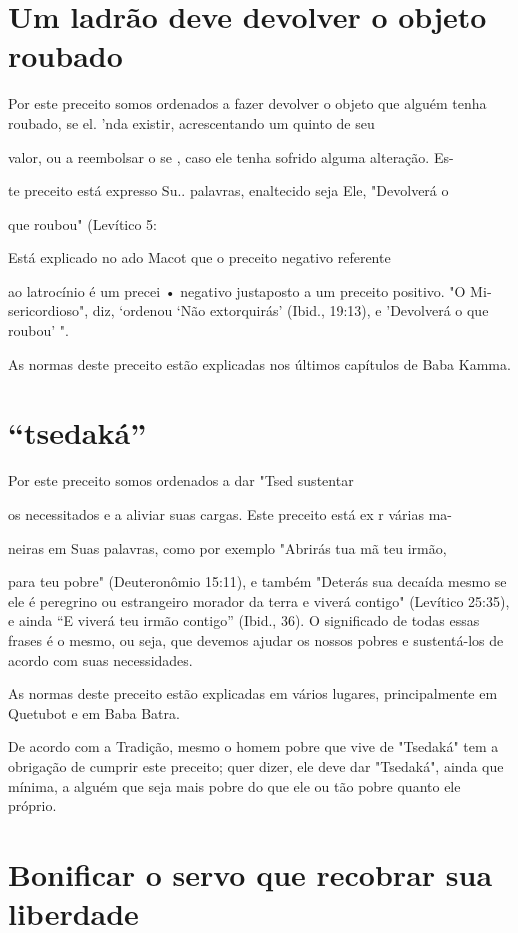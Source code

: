 \section{Um ladrão deve devolver o objeto roubado}

Por este preceito somos ordenados a fazer devolver o objeto que alguém
tenha roubado, se el. 'nda existir, acrescentando um
quinto de seu

valor, ou a reembolsar o se , caso ele tenha sofrido alguma alteração.
Es-

te preceito está expresso Su.. palavras, enaltecido seja Ele, "Devolverá
o

que roubou" (Levítico 5:

Está explicado no ado Macot que o preceito negativo referente

ao latrocínio é um precei • negativo justaposto a um preceito positivo.
"O Mi­sericordioso", diz, `ordenou `Não extorquirás' (Ibid., 19:13), e
'Devolverá o que roubou' ".

As normas deste preceito estão explicadas nos últimos capítulos de Baba
Kamma.

\section{``tsedaká''}

Por este preceito somos ordenados a dar "Tsed sustentar

os necessitados e a aliviar suas cargas. Este preceito está ex r várias
ma-

neiras em Suas palavras, como por exemplo "Abrirás tua mã teu irmão,

para teu pobre" (Deuteronômio 15:11), e também "Deterás sua decaída
mes­mo se ele é peregrino ou estrangeiro morador da terra e viverá
contigo" (Leví­tico 25:35), e ainda ``E viverá teu irmão contigo'' (Ibid.,
36). O significado de todas essas frases é o mesmo, ou seja, que devemos
ajudar os nossos pobres e sustentá-los de acordo com suas necessidades.

As normas deste preceito estão explicadas em vários lugares,
princi­palmente em Quetubot e em Baba Batra.

De acordo com a Tradição, mesmo o homem pobre que vive de "Tse­daká" tem
a obrigação de cumprir este preceito; quer dizer, ele deve dar
"Tse­daká", ainda que mínima, a alguém que seja mais pobre do que ele ou
tão po­bre quanto ele próprio.

\section{Bonificar o servo que recobrar sua liberdade}

